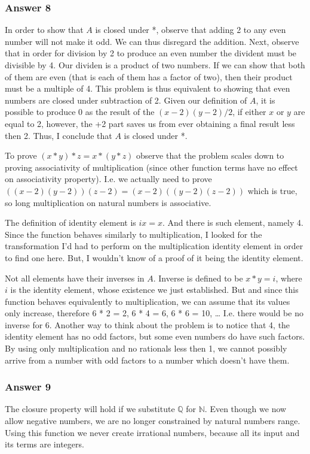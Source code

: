 \documentclass[11pt]{article}
\begin{document}
\subsubsection{Answer 8}
\label{sec-1-3-1}
In order to show that $A$ is closed under *, observe that adding 2 to any
even number will not make it odd.  We can thus disregard the addition.
Next, observe that in order for division by 2 to produce an even number the
divident must be divisible by 4.  Our dividen is a product of two numbers.
If we can show that both of them are even (that is each of them has a factor
of two), then their product must be a multiple of 4.  This problem is thus
equivalent to showing that even numbers are closed under subtraction of 2.
Given our definition of $A$, it is possible to produce 0 as the result of
the $(x - 2)(y - 2)/2$, if either $x$ or $y$ are equal to 2, however, the +2
part saves us from ever obtaining a final result less then 2.  Thus, I
conclude that $A$ is closed under *.

To prove $(x * y) * z = x * (y * z)$ observe that the problem scales down to
proving associativity of multiplication (since other function terms have no effect
on associativity property).  I.e. we actually need to prove
$((x - 2)(y - 2))(z - 2) = (x - 2)((y - 2)(z - 2))$ which is true, so long
multiplication on natural numbers is associative.

The definition of identity element is $ix = x$. And there is such element,
namely 4.  Since the function behaves similarly to multiplication, I looked
for the transformation I'd had to perform on the multiplication identity
element in order to find one here.  But, I wouldn't know of a proof of it
being the identity element.

Not all elements have their inverses in $A$. Inverse is defined to be $x * y = i$,
where $i$ is the identity element, whose existence we just established.  But
and since this function behaves equivalently to multiplication, we can assume
that its values only increase, therefore 6 * 2 = 2, 6 * 4 = 6, 6 * 6 = 10, \ldots{}
I.e. there would be no inverse for 6.  Another way to think about the problem
is to notice that 4, the identity element has no odd factors, but some even
numbers do have such factors.  By using only multiplication and no rationals less
then 1, we cannot possibly arrive from a number with odd factors to a number which
doesn't have them.
\subsubsection{Answer 9}
\label{sec-1-3-2}
The closure property will hold if we substitute $\mathbb{Q}$ for $\mathbb{N}$.
Even though we now allow negative numbers, we are no longer constrained by natural
numbers range.  Using this function we never create irrational numbers, because
all its input and its terms are integers.
\end{document}
